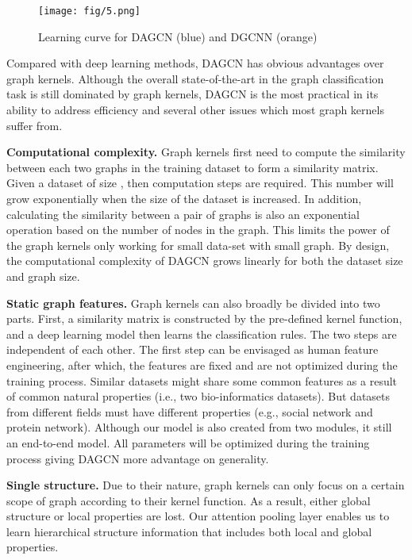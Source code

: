 \documentclass[conference]{IEEEtran}
\begin{document}
	\begin{figure*}
 	 	\centering
 	 		\texttt{[image: fig/5.png]}
 	 	    \caption{Learning curve for DAGCN (blue) and DGCNN (orange)}   
 	 	\label{fig:efficiency}
	\end{figure*}
	
	Compared with deep learning methods, DAGCN has obvious advantages over graph kernels. Although the overall state-of-the-art in the graph classification task is still dominated by graph kernels, DAGCN is the most practical in its ability to address efficiency and several other issues which most graph kernels suffer from.
	
	\textbf{Computational complexity.} Graph kernels first need to compute the similarity between each two graphs in the training dataset to form a similarity matrix. Given a dataset of size , then  computation steps are required. This number will grow exponentially when the size of the dataset is increased. In addition, calculating the similarity between a pair of graphs is also an exponential operation based on the number of nodes in the graph. This limits the power of the graph kernels only working for small data-set with small graph. By design, the computational complexity of DAGCN grows linearly for both the dataset size and graph size.
	
	\textbf{Static graph features.} Graph kernels can also broadly be divided into two parts. First, a similarity matrix is constructed by the pre-defined kernel function, and a deep learning model then learns the classification rules. The two steps are independent of each other. The first step can be envisaged as human feature engineering, after which, the features are fixed and are not optimized during the training process. Similar datasets might share some common features as a result of common natural properties (i.e., two bio-informatics datasets). But datasets from different fields must have different properties (e.g., social network and protein network). Although our model is also created from two modules, it still an end-to-end model. All parameters will be optimized during the training process giving DAGCN more advantage on generality.
	
	\textbf{Single structure.} Due to their nature, graph kernels can only focus on a certain scope of graph according to their kernel function. As a result, either global structure or local properties are lost. Our attention pooling layer enables us to learn hierarchical structure information that includes both local and global properties.
		
\end{document}
